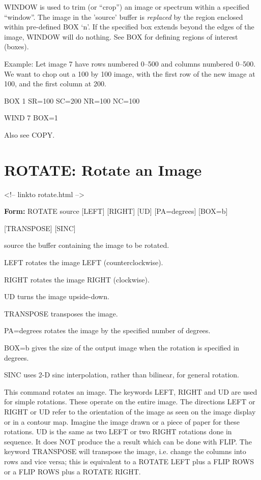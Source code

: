 WINDOW is used to trim (or ``crop'') an image or spectrum within a
specified ``window''.  The image in the 'source' buffer is 
\textit{replaced} by the region enclosed within pre-defined BOX `n'. 
If the specified box extends beyond the edges of the image, WINDOW will do
nothing.  See BOX for defining regions of interest (boxes).

Example: Let image 7 have rows numbered 0--500 and columns numbered 0--500.
We want to chop out a 100 by 100 image, with the first row of the new image
at 100, and the first column at 200.
\begin{hanging}
  \item{BOX 1 SR=100 SC=200 NR=100 NC=100}
  \item{WIND 7 BOX=1}
\end{hanging}

Also see COPY.

\section{ROTATE: Rotate an Image}
\begin{rawhtml}
<!-- linkto rotate.html -->
\end{rawhtml}
\begin{command}
  \item[\textbf{Form: }   ROTATE source {[LEFT]} {[RIGHT]} {[UD]} 
       {[PA=degrees]} {[BOX=b]} \hfill]{}
  \item{{[TRANSPOSE]} {[SINC]}}
  \item[source]{the buffer containing the image to be rotated.}
  \item[LEFT]{rotates the image LEFT (counterclockwise).}
  \item[RIGHT]{rotates the image RIGHT (clockwise).}
  \item[UD]{turns the image upside-down.}
  \item[TRANSPOSE]{transposes the image.}
  \item[PA=degrees]{rotates the image by the specified number of degrees.}
  \item[BOX=b]{gives the size of the output image when the rotation is 
       specified in degrees.}
  \item[SINC]{uses 2-D sinc interpolation, rather than bilinear,
       for general rotation.}
\end{command}

This command rotates an image.  The keywords LEFT, RIGHT and UD are used
for simple rotations.  These operate on the entire image.  The directions
LEFT or RIGHT or UD refer to the orientation of the image as seen on the
image display or in a contour map.  Imagine the image drawn or a piece of paper
for these rotations.  UD is the same as two LEFT or two RIGHT rotations
done in sequence.  It does NOT produce the a result which can be done with
FLIP. The keyword TRANSPOSE will transpose the image, i.e. change the
columns into rows and vice versa; this is equivalent to a ROTATE LEFT plus
a FLIP ROWS or a FLIP ROWS plus a ROTATE RIGHT.

